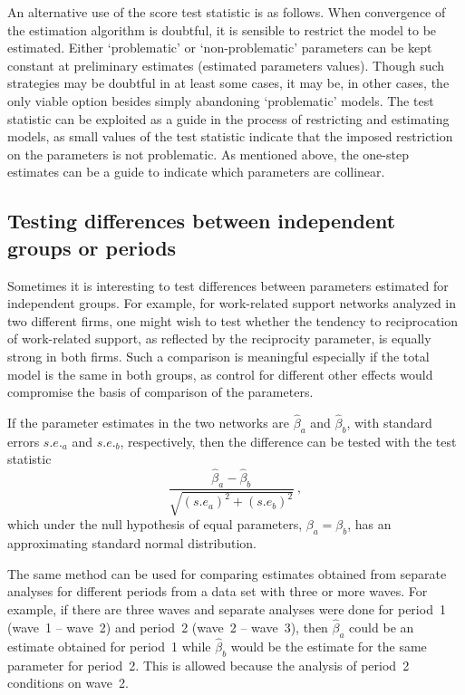 \documentclass[a4paper,fleqn,11pt]{article}
\newcommand{\+}{\, + \,}
\begin{document}
An alternative use of the score test statistic is as follows. When
convergence of the estimation algorithm is doubtful, it is sensible
to restrict the model to be estimated. Either `problematic' or
`non-problematic' parameters can be kept constant at preliminary
estimates (estimated parameters values). Though such strategies may
be doubtful in at least some cases, it may be, in other cases, the
only viable option besides simply abandoning `problematic' models.
The test statistic can be exploited as a guide in the process of
restricting and estimating models, as small values of the test
statistic indicate that the imposed restriction on the parameters is
not problematic.
As mentioned above, the  one-step estimates can be a guide
to indicate which parameters are collinear.

\subsection{Testing differences between independent groups or periods}

Sometimes it is interesting to test differences between parameters estimated for
independent groups. For example, for work-related support networks analyzed in
two different firms, one might wish to test whether the tendency to
reciprocation of work-related support, as reflected by the reciprocity
parameter, is equally strong in both firms.  Such a comparison is meaningful
especially if the total model is the same in both groups, as control for
different other effects would compromise the basis of comparison of the
parameters.

If the parameter estimates in the two networks are $\hat\beta_a$ and $\hat\beta_b$,
with standard errors $s.e._a$ and  $s.e._b$, respectively,
then the difference can be tested with the test statistic
\begin{equation}
    \frac{\hat\beta_a  - \hat\beta_b}{\sqrt{(s.e_a)^2 + (s.e_b)^2}} \ ,
\end{equation}
which under the null hypothesis of equal parameters,
$\beta_a = \beta_b$, has an approximating
standard normal distribution.

The same method can be used for comparing estimates obtained from
separate analyses for different periods from a data set with three
or more waves. For example, if there are three waves and separate analyses
were done for period~1 (wave~1 -- wave~2) and  period~2 (wave~2 -- wave~3),
then $\hat\beta_a$ could be an estimate obtained for period~1 while
$\hat\beta_b$ would be the estimate for the same parameter for period~2.
This is allowed because the analysis of period~2 conditions on wave~2.
\end{document}
